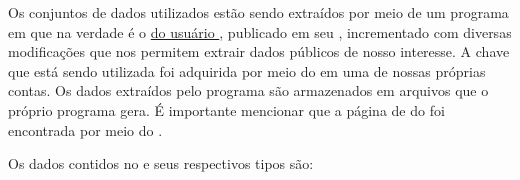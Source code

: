   Os conjuntos de dados utilizados estão sendo extraídos por meio de um programa em  que na verdade é o \href{https://github.com/mitchelljy/Trending-YouTube-Scraper}{ do usuário }, publicado em seu \href{https://github.com/mitchelljy}{}, incrementado com diversas modificações que nos permitem extrair dados públicos de nosso interesse. A chave \href{https://developers.google.com/youtube/v3/docs?hl=pt-br}{} que está sendo utilizada foi adquirida por meio do  em uma de nossas próprias contas. Os dados extraídos pelo programa são armazenados em arquivos  que o próprio programa gera. É importante mencionar que a página de  do  foi encontrada por meio do  \cite{kaggle}.

  Os dados contidos no  e seus respectivos tipos são:

